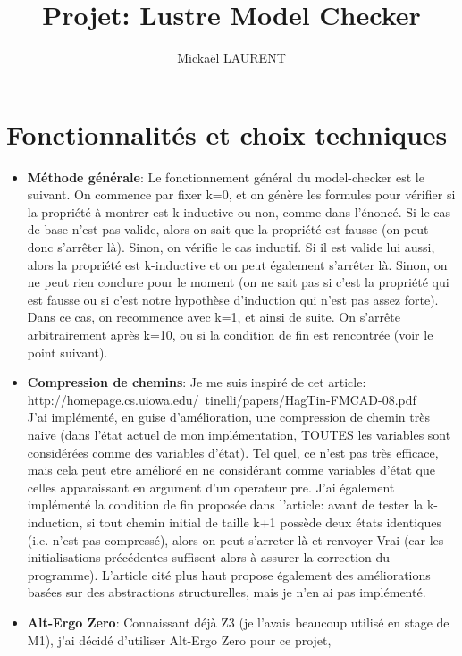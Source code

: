 \documentclass[a4paper]{article}%
\title{\vspace{1.5cm}Projet: Lustre Model Checker}
\author{Mickaël LAURENT}
\date{\vspace{-5ex}}
\begin{document}
    \maketitle

    \section{Fonctionnalités et choix techniques}
		
	\begin{itemize}
		\item \textbf{Méthode générale}: Le fonctionnement général du model-checker est le suivant.
		On commence par fixer k=0, et on génère les formules pour vérifier si la propriété à montrer est k-inductive ou non, comme dans l'énoncé.
		Si le cas de base n'est pas valide, alors on sait que la propriété est fausse (on peut donc s'arrêter là). Sinon, on vérifie le cas inductif.
		Si il est valide lui aussi, alors la propriété est k-inductive et on peut également s'arrêter là. Sinon, on ne peut rien conclure pour le moment
		(on ne sait pas si c'est la propriété qui est fausse ou si c'est notre hypothèse d'induction qui n'est pas assez forte). Dans ce cas, on recommence avec k=1, et ainsi de suite.
		On s'arrête arbitrairement après k=10, ou si la condition de fin est rencontrée (voir le point suivant).\\
		\item \textbf{Compression de chemins}: Je me suis inspiré de cet article:\\http://homepage.cs.uiowa.edu/~tinelli/papers/HagTin-FMCAD-08.pdf\\
		J'ai implémenté, en guise d'amélioration,
		une compression de chemin très naive (dans l'état actuel de mon implémentation, TOUTES les variables sont considérées comme des variables d'état).
		Tel quel, ce n'est pas très efficace, mais cela peut etre amélioré en ne considérant comme variables d'état que celles apparaissant en argument d'un operateur pre.
		J'ai également implémenté la condition de fin proposée dans l'article: avant de tester la k-induction, si tout chemin initial de taille k+1 possède deux états identiques (i.e. n'est pas compressé),
		alors on peut s'arreter là et renvoyer Vrai (car les initialisations précédentes suffisent alors à assurer la correction du programme).
		L'article cité plus haut propose également des améliorations basées sur des abstractions structurelles, mais je n'en ai pas implémenté.\\
		\item \textbf{Alt-Ergo Zero}: Connaissant déjà Z3 (je l'avais beaucoup utilisé en stage de M1), j'ai décidé d'utiliser Alt-Ergo Zero pour ce projet,

\end{itemize}
\end{document}
